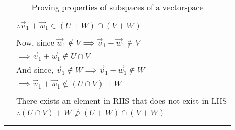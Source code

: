 \begin{longtable}{|l|l|}
        & $\therefore \vec{v}_1 + \vec{w}_1 \in (U+W) \cap (V+W)$\\
        & \\
        & Now, since $\vec{w}_1 \not\in V \implies \vec{v}_1 + \vec{w}_1 \not\in V$\\
        & $\implies \vec{v}_1 + \vec{w}_1 \not\in U \cap V$\\
        & And since, $\vec{v}_1 \not\in W \implies \vec{v}_1 + \vec{w}_1 \not\in W$\\
        & $\implies \vec{v}_1 + \vec{w}_1 \not\in (U \cap V) + W$\\
        & \\
        & There exists an element in RHS that does not exist in LHS\\
        & $\therefore (U \cap V) + W \not\supset (U+W) \cap (V+W)$\\
        & \\
    \hline
    \caption{Proving properties of subspaces of a vectorspace}
    \label{eq:solutions/2014/dec/77/tab:proof}
\end{longtable}
\twocolumn
